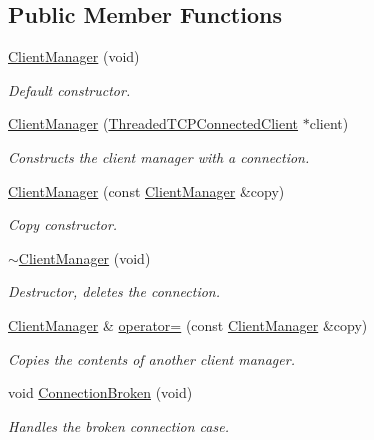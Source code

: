 \subsection*{Public Member Functions}
\begin{DoxyCompactItemize}
\item 
\hyperlink{class_client_manager_ad012b20c788f625e98e09e849744a8d9}{Client\-Manager} (void)
\begin{DoxyCompactList}\small\item\em Default constructor. \end{DoxyCompactList}\item 
\hyperlink{class_client_manager_acdcd9f65fd1f9c819e9d8a8130e661ca}{Client\-Manager} (\hyperlink{class_threaded_t_c_p_connected_client}{Threaded\-T\-C\-P\-Connected\-Client} $\ast$client)
\begin{DoxyCompactList}\small\item\em Constructs the client manager with a connection. \end{DoxyCompactList}\item 
\hyperlink{class_client_manager_aa99b4fc6e351914f367db37ea83d1e65}{Client\-Manager} (const \hyperlink{class_client_manager}{Client\-Manager} \&copy)
\begin{DoxyCompactList}\small\item\em Copy constructor. \end{DoxyCompactList}\item 
\hyperlink{class_client_manager_abac29dfed67c8b8354cf07267fd5515b}{$\sim$\-Client\-Manager} (void)
\begin{DoxyCompactList}\small\item\em Destructor, deletes the connection. \end{DoxyCompactList}\item 
\hyperlink{class_client_manager}{Client\-Manager} \& \hyperlink{class_client_manager_a1b3ae7dda1e6d1a2939c3eb6a1b9cbd1}{operator=} (const \hyperlink{class_client_manager}{Client\-Manager} \&copy)
\begin{DoxyCompactList}\small\item\em Copies the contents of another client manager. \end{DoxyCompactList}\item 
void \hyperlink{class_client_manager_a4fa8fc5731587276f5e6be92563474fa}{Connection\-Broken} (void)
\begin{DoxyCompactList}\small\item\em Handles the broken connection case. \end{DoxyCompactList}\item 

\end{DoxyCompactItemize}
